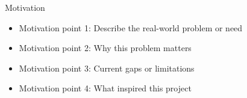 
\begin{frame}{Motivation}
    \begin{itemize}
        \item Motivation point 1: Describe the real-world problem or need
        \item Motivation point 2: Why this problem matters
        \item Motivation point 3: Current gaps or limitations
        \item Motivation point 4: What inspired this project
    \end{itemize}
\end{frame}
